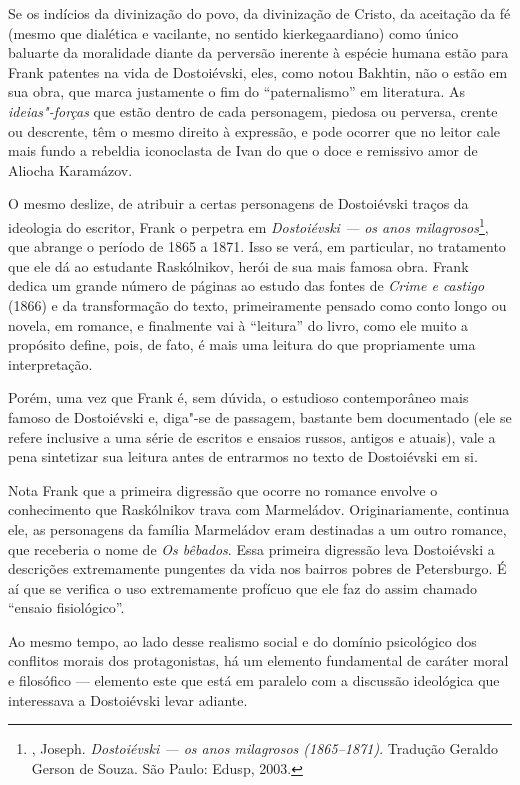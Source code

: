 Se os indícios da divinização do povo, da divinização de Cristo, da
aceitação da fé (mesmo que dialética e vacilante, no sentido
kierkegaardiano) como único baluarte da moralidade diante da perversão
inerente à espécie humana estão para Frank patentes na vida de
Dostoiévski, eles, como notou Bakhtin, não o estão em sua obra, que
marca justamente o fim do ``paternalismo'' em literatura. As
\emph{ideias"-forças} que estão dentro de cada personagem, piedosa
ou perversa, crente ou descrente, têm o mesmo direito à expressão, e
pode ocorrer que no leitor cale mais fundo a rebeldia iconoclasta de
Ivan do que o doce e remissivo amor de Aliocha Karamázov.

O mesmo deslize, de atribuir a certas personagens de Dostoiévski traços
da ideologia do escritor, Frank o perpetra em \emph{Dostoiévski --- os
anos milagrosos}\footnote{, Joseph. \emph{Dostoiévski --- os anos
  milagrosos (1865--1871)}. Tradução Geraldo Gerson de Souza. São Paulo:
  Edusp, 2003.}, que abrange o período de 1865 a 1871. Isso se verá, em
particular, no tratamento que ele dá ao estudante Raskólnikov, herói de
sua mais famosa obra. Frank dedica um grande número de páginas ao estudo
das fontes de \emph{Crime e castigo} (1866) e da transformação do texto,
primeiramente pensado como conto longo ou novela, em romance, e
finalmente vai à ``leitura'' do livro, como ele muito a propósito
define, pois, de fato, é mais uma leitura do que propriamente uma
interpretação.

Porém, uma vez que Frank é, sem dúvida, o estudioso contemporâneo mais
famoso de Dostoiévski e, diga"-se de passagem, bastante bem documentado
(ele se refere inclusive a uma série de escritos e ensaios russos,
antigos e atuais), vale a pena sintetizar sua leitura antes de entrarmos
no texto de Dostoiévski em si.

Nota Frank que a primeira digressão que ocorre no romance envolve o
conhecimento que Raskólnikov trava com Marmeládov. Originariamente,
continua ele, as personagens da família Marmeládov eram destinadas a um
outro romance, que receberia o nome de \emph{Os bêbados}. Essa primeira
digressão leva Dostoiévski a descrições extremamente pungentes da vida
nos bairros pobres de Petersburgo. É aí que se verifica o uso
extremamente profícuo que ele faz do assim chamado ``ensaio
fisiológico''.

Ao mesmo tempo, ao lado desse realismo social e do domínio psicológico
dos conflitos morais dos protagonistas, há um elemento fundamental de
caráter moral e filosófico --- elemento este que está em paralelo com a
discussão ideológica que interessava a Dostoiévski levar adiante.

